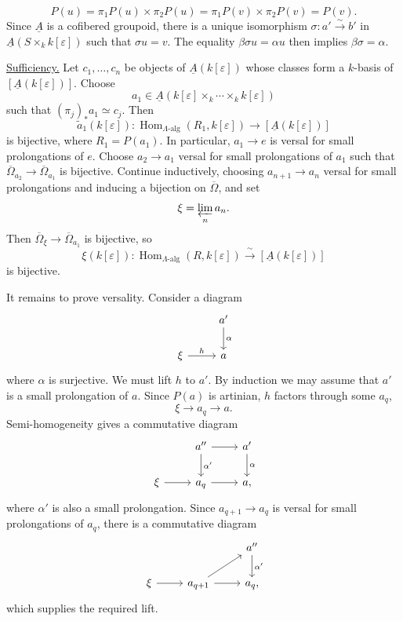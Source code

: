 
\[
 P(u)=\pi_1P(u)\times\pi_2P(u)
     =\pi_1P(v)\times\pi_2P(v)=P(v).
\]
Since $\underline A$ is a cofibered groupoid, there is a unique
isomorphism $\sigma:a'\xrightarrow{\sim}b'$ in
$\underline A(S\times_k k[\varepsilon])$ such that $\sigma u=v$.
The equality $\beta\sigma u=\alpha u$ then implies
$\beta\sigma=\alpha$.

\underline{Sufficiency.} Let $c_1,\ldots,c_n$ be objects of
$\underline A(k[\varepsilon])$ whose classes form a $k$-basis of
$[\underline A(k[\varepsilon])]$. Choose
\[
 a_1\in\underline A(
 k[\varepsilon]\times_k\cdots\times_k k[\varepsilon])
\]
such that $(\pi_j)_*a_1\simeq c_j$. Then
\[
 \widetilde a_1(k[\varepsilon]):
 \operatorname{Hom}_{\Lambda\text{-alg}}(R_1,k[\varepsilon])
 \longrightarrow[\underline A(k[\varepsilon])]
\]
is bijective, where $R_1=P(a_1)$. In particular,
$a_1\longrightarrow e$ is versal for small prolongations of $e$.
Choose $a_2\longrightarrow a_1$ versal for small prolongations of
$a_1$ such that
$\overline\Omega_{a_2}\longrightarrow\overline\Omega_{a_1}$ is
bijective. Continue inductively, choosing
$a_{n+1}\longrightarrow a_n$ versal for small prolongations and
inducing a bijection on $\overline\Omega$, and set
\[
 \xi=\varprojlim_n a_n.
\]
Then $\overline\Omega_\xi\longrightarrow\overline\Omega_{a_1}$ is
bijective, so
\[
 \xi(k[\varepsilon]):
 \operatorname{Hom}_{\Lambda\text{-alg}}(R,k[\varepsilon])
 \xrightarrow{\ \sim\ }
 [\underline A(k[\varepsilon])]
\]
is bijective.

It remains to prove versality. Consider a diagram
\[
\begin{tikzcd}
& a' \arrow[d,"\alpha"] \\
\xi \arrow[r,"h"] & a
\end{tikzcd}
\]
where $\alpha$ is surjective. We must lift $h$ to $a'$. By induction
we may assume that $a'$ is a small prolongation of $a$. Since $P(a)$
is artinian, $h$ factors through some $a_q$,
\[
 \xi\longrightarrow a_q\longrightarrow a.
\]
Semi-homogeneity gives a commutative diagram
\[
\begin{tikzcd}
& a'' \arrow[r] \arrow[d,"\alpha'"] & a' \arrow[d,"\alpha"] \\
\xi \arrow[r] & a_q \arrow[r] & a,
\end{tikzcd}
\]
where $\alpha'$ is also a small prolongation. Since
$a_{q+1}\longrightarrow a_q$ is versal for small prolongations of
$a_q$, there is a commutative diagram
\[
\begin{tikzcd}
& & a'' \arrow[d,"\alpha'"] \\
\xi \arrow[r] & a_{q+1} \arrow[r] \arrow[ur] & a_q,
\end{tikzcd}
\]
which supplies the required lift.

